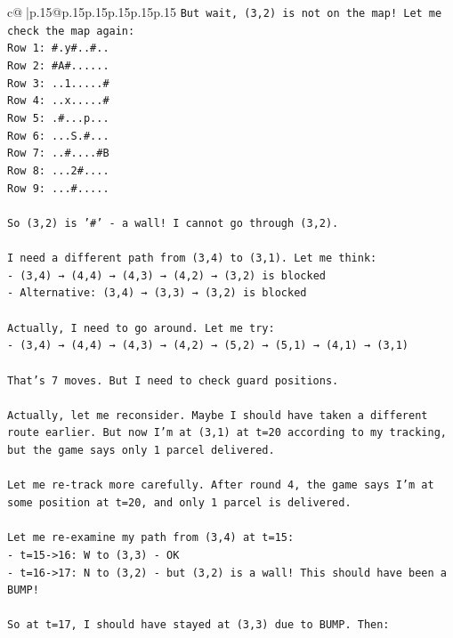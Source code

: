 \documentclass{article}
\begin{document}
{\begin{supertabular}{c@{$\;$}|p{.15\linewidth}@{}p{.15\linewidth}p{.15\linewidth}p{.15\linewidth}p{.15\linewidth}p{.15\linewidth}}
{{{\texttt{But wait, (3,2) is not on the map! Let me check the map again:} \\
\texttt{Row 1: \#.y\#..\#..} \\
\texttt{Row 2: \#A\#......} \\
\texttt{Row 3: ..1.....\#} \\
\texttt{Row 4: ..x.....\#} \\
\texttt{Row 5: .\#...p...} \\
\texttt{Row 6: ...S.\#...} \\
\texttt{Row 7: ..\#....\#B} \\
\texttt{Row 8: ...2\#....} \\
\texttt{Row 9: ...\#.....} \\
\\ 
\texttt{So (3,2) is '\#' {-} a wall! I cannot go through (3,2).} \\
\\ 
\texttt{I need a different path from (3,4) to (3,1). Let me think:} \\
\texttt{{-} (3,4) → (4,4) → (4,3) → (4,2) → (3,2) is blocked} \\
\texttt{{-} Alternative: (3,4) → (3,3) → (3,2) is blocked} \\
\\ 
\texttt{Actually, I need to go around. Let me try:} \\
\texttt{{-} (3,4) → (4,4) → (4,3) → (4,2) → (5,2) → (5,1) → (4,1) → (3,1)} \\
\\ 
\texttt{That's 7 moves. But I need to check guard positions.} \\
\\ 
\texttt{Actually, let me reconsider. Maybe I should have taken a different route earlier. But now I'm at (3,1) at t=20 according to my tracking, but the game says only 1 parcel delivered.} \\
\\ 
\texttt{Let me re{-}track more carefully. After round 4, the game says I'm at some position at t=20, and only 1 parcel is delivered. } \\
\\ 
\texttt{Let me re{-}examine my path from (3,4) at t=15:} \\
\texttt{{-} t=15{-}>16: W to (3,3) {-} OK} \\
\texttt{{-} t=16{-}>17: N to (3,2) {-} but (3,2) is a wall! This should have been a BUMP!} \\
\\ 
\texttt{So at t=17, I should have stayed at (3,3) due to BUMP. Then:} \\
}}}
\end{supertabular}}
\end{document}
